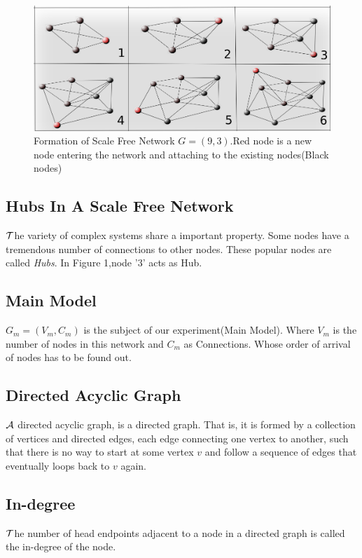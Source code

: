 \documentclass{article}
\begin{document}
\begin{figure}[htp]
\centering
\includegraphics[scale=0.35]{Figures/ScaleFreeNetwork.png}
\caption{Formation of Scale Free Network $G=(9,3)$.Red node is a new node entering the network and attaching to the existing nodes(Black nodes)}
\label{}
\end{figure}

\subsection{Hubs In A Scale Free Network}
\hspace{.18in}$\cal T$he variety of complex systems share a important property. Some nodes have a tremendous number of connections to other nodes. These popular nodes are called \emph{Hubs}. In Figure 1,node '3' acts as Hub. 
\subsection{Main Model}
\hspace{.18in}$G_m = (V_m,C_m)$ is the subject of our experiment(Main Model). Where $V_m$ is the number of nodes in this network and $C_m$ as Connections. Whose order of arrival of nodes has to be found out.
\subsection{Directed Acyclic Graph}
\hspace{.18in}$\cal A$ directed acyclic graph, is a directed graph. That is, it is formed by a collection of vertices and directed edges, each edge connecting one vertex to another, such that there is no way to start at some vertex $v$ and follow a sequence of edges that eventually loops back to $v$ again.
\subsection{In-degree} 
\hspace{.18in} $\cal T$he number of head endpoints adjacent to a node in a directed graph is called the in-degree of the node.
\end{document}
